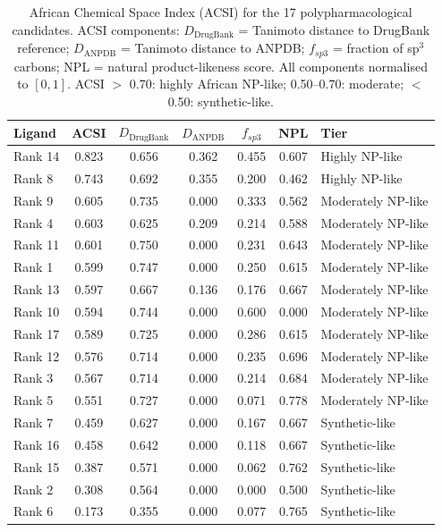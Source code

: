 \documentclass[11pt,a4paper]{article}
\begin{document}
\begin{table}[htbp]
\centering
\caption{African Chemical Space Index (ACSI) for the \num{17} polypharmacological candidates. ACSI components: $D_{\mathrm{DrugBank}}$ = Tanimoto distance to DrugBank reference; $D_{\mathrm{ANPDB}}$ = Tanimoto distance to ANPDB; $f_{sp3}$ = fraction of sp$^3$ carbons; NPL = natural product-likeness score. All components normalised to $[0,1]$. ACSI $>$ \num{0.70}: highly African NP-like; \numrange{0.50}{0.70}: moderate; $<$ \num{0.50}: synthetic-like.}
\label{tab:acsi}
\begin{tabularx}{\textwidth}{l S[table-format=1.3] S[table-format=1.3] S[table-format=1.3] S[table-format=1.3] S[table-format=1.3] l}
\toprule
Ligand & {ACSI} & {$D_{\mathrm{DrugBank}}$} & {$D_{\mathrm{ANPDB}}$} & {$f_{sp3}$} & {NPL} & Tier \\
\midrule
Rank 14 & 0.823 & 0.656 & 0.362 & 0.455 & 0.607 & Highly NP-like \\
Rank 8  & 0.743 & 0.692 & 0.355 & 0.200 & 0.462 & Highly NP-like \\
Rank 9  & 0.605 & 0.735 & 0.000 & 0.333 & 0.562 & Moderately NP-like \\
Rank 4  & 0.603 & 0.625 & 0.209 & 0.214 & 0.588 & Moderately NP-like \\
Rank 11 & 0.601 & 0.750 & 0.000 & 0.231 & 0.643 & Moderately NP-like \\
Rank 1  & 0.599 & 0.747 & 0.000 & 0.250 & 0.615 & Moderately NP-like \\
Rank 13 & 0.597 & 0.667 & 0.136 & 0.176 & 0.667 & Moderately NP-like \\
Rank 10 & 0.594 & 0.744 & 0.000 & 0.600 & 0.000 & Moderately NP-like \\
Rank 17 & 0.589 & 0.725 & 0.000 & 0.286 & 0.615 & Moderately NP-like \\
Rank 12 & 0.576 & 0.714 & 0.000 & 0.235 & 0.696 & Moderately NP-like \\
Rank 3  & 0.567 & 0.714 & 0.000 & 0.214 & 0.684 & Moderately NP-like \\
Rank 5  & 0.551 & 0.727 & 0.000 & 0.071 & 0.778 & Moderately NP-like \\
Rank 7  & 0.459 & 0.627 & 0.000 & 0.167 & 0.667 & Synthetic-like \\
Rank 16 & 0.458 & 0.642 & 0.000 & 0.118 & 0.667 & Synthetic-like \\
Rank 15 & 0.387 & 0.571 & 0.000 & 0.062 & 0.762 & Synthetic-like \\
Rank 2  & 0.308 & 0.564 & 0.000 & 0.000 & 0.500 & Synthetic-like \\
Rank 6  & 0.173 & 0.355 & 0.000 & 0.077 & 0.765 & Synthetic-like \\
\bottomrule
\end{tabularx}
\end{table}
\end{document}
